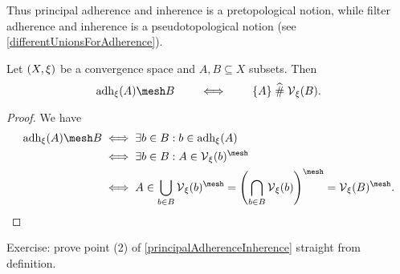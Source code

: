 Thus principal adherence and inherence is a pretopological notion, while filter adherence and inherence is a pseudotopological notion (see \ref{differentUnionsForAdherence}).
\begin{corollary} \label{setAdherenceInherence}
Let $\left( X,\xi \right)$ be a convergence space and $A,B\subseteq X$ subsets. Then
\[ \adh_\xi(A) \mesh B \qquad\iff\qquad \{A\} \amesh \vicinity_\xi(B). \]
\end{corollary}
\begin{proof}
We have
\begin{align*}
\adh_\xi(A) \mesh B &\iff \exists b\in B: b\in \adh_\xi(A) \\
&\iff \exists b\in B: A\in \vicinity_\xi(b)^{\mesh} \\
&\iff A \in \bigcup_{b\in B}\vicinity_\xi(b)^{\mesh} = \left(\bigcap_{b\in B}\vicinity_\xi(b)\right)^{\mesh} = \vicinity_\xi(B)^{\mesh}.
\end{align*}
\end{proof}

\begin{note}
Exercise: prove point (2) of \ref{principalAdherenceInherence} straight from definition.
\end{note}

